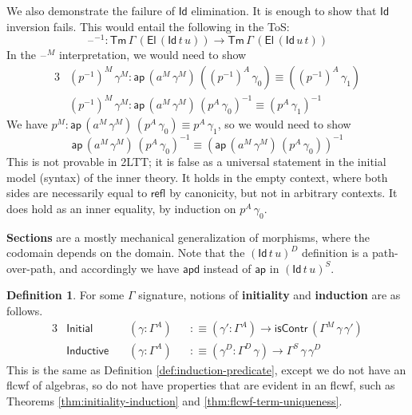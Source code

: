 \documentclass[12pt,a4paper,twoside,openany]{book}
\theoremstyle{remark}
\theoremstyle{definition}
\newtheorem{mydefinition}{Definition}
\theoremstyle{theorem}
\newcommand{\ms}[1]{\mathsf{#1}}
\newcommand{\ap}{\ms{ap}}
\newcommand{\apd}{\ms{apd}}
\newcommand{\refl}{\mathsf{refl}}
\newcommand{\Tm}{\mathsf{Tm}}
\newcommand{\El}{\mathsf{El}}
\newcommand{\Id}{\mathsf{Id}}
\newcommand{\blank}{\mathord{\hspace{1pt}\text{--}\hspace{1pt}}}
\newcommand{\defn}{:\equiv}
\begin{document}
We also demonstrate the failure of $\Id$ elimination. It is enough to show that
$\Id$ inversion fails. This would entail the following in the ToS:
\[
  \blank^{-1} : \Tm\,\Gamma\,(\El\,(\Id\,t\,u)) \to \Tm\,\Gamma\,(\El\,(\Id\,u\,t))
\]
In the $\blank^M$ interpretation, we would need to show
\begin{alignat*}{3}
  &(p^{-1})^M\,\gamma^M : \ap\,(a^M\,\gamma^M)\,((p^{-1})^A\,\gamma_0) \equiv ((p^{-1})^A\,\gamma_1)\\
  &(p^{-1})^M\,\gamma^M : \ap\,(a^M\,\gamma^M)\, (p^A\,\gamma_0)^{-1} \equiv (p^A\,\gamma_1)^{-1}
\end{alignat*}
We have $p^M : \ap\,(a^M\,\gamma^M)\,(p^A\,\gamma_0) \equiv p^A\,\gamma_1$,
so we would need to show
\[
  \ap\,(a^M\,\gamma^M)\, (p^A\,\gamma_0)^{-1} \equiv (\ap\,(a^M\,\gamma^M)\,(p^A\,\gamma_0))^{-1}
\]
This is not provable in 2LTT; it is false as a universal statement in the
initial model (syntax) of the inner theory. It holds in the empty context, where
both sides are necessarily equal to $\refl$ by canonicity, but not in arbitrary
contexts. It does hold as an inner equality, by induction on $p^A\,\gamma_0$.

\textbf{Sections} are a mostly mechanical generalization of morphisms, where the
codomain depends on the domain. Note that the $(\Id\,t\,u)^D$ definition is a
path-over-path, and accordingly we have $\apd$ instead of $\ap$ in $(\Id\,t\,u)^S$.

\begin{mydefinition} For some $\Gamma$ signature, notions of \textbf{initiality} and \textbf{induction} are
as follows.
\begin{alignat*}{3}
  &\ms{Initial}\,&&(\gamma : \Gamma^A) &&\defn (\gamma' : \Gamma^A) \to \ms{isContr}\,(\Gamma^M\,\gamma\,\gamma')\\
  &\ms{Inductive}\,&&(\gamma : \Gamma^A) &&\defn (\gamma^D : \Gamma^D\,\gamma) \to \Gamma^S\,\gamma\,\gamma^D
\end{alignat*}
This is the same as Definition \ref{def:induction-predicate}, except we do not have an
flcwf of algebras, so do not have properties that are evident in an flcwf, such
as Theorems \ref{thm:initiality-induction} and \ref{thm:flcwf-term-uniqueness}.
\end{mydefinition}
\end{document}
